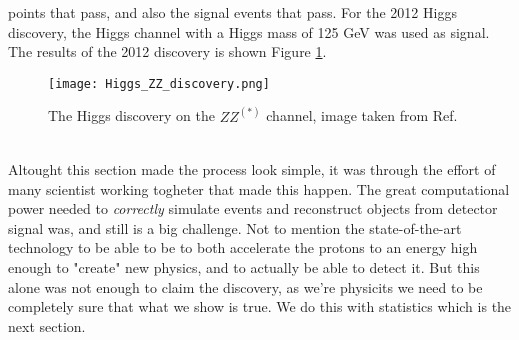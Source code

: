 \documentclass[12pt, a4paper]{book}
\begin{document}
points that pass, and also the signal events that pass. For the 2012 Higgs discovery, the Higgs channel with a Higgs mass of 125 GeV was used as signal. 
The results of the 2012 discovery is shown Figure \ref{fig:Higgs_ZZ}.\\
\begin{figure}[!ht]
	\centering
    \texttt{[image: Higgs\_ZZ\_discovery.png]}
    \caption[The Higgs discovery on the $ZZ^{(*)}$ channel]{The Higgs discovery on the $ZZ^{(*)}$ channel, image taken from Ref. \cite{Higgs_discovery_2012}}\label{fig:Higgs_ZZ}
\end{figure}
\\Altought this section made the process look simple, it was through the effort of many scientist working togheter that made this happen. The great computational power needed to \textit{correctly} simulate events and reconstruct objects from detector signal was, and still is a big challenge.
Not to mention the state-of-the-art technology to be able to be to both accelerate the protons to an energy high enough to "create" new physics, and to actually be able to detect it. But this alone was not enough to claim the discovery, as we're physicits we need 
to be completely sure that what we show is true. We do this with statistics which is the next section.
\clearpage
\end{document}
